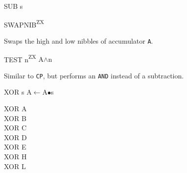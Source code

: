 \documentclass[12pt,twoside,openright,a4paper]{book}
\newcommand{\ZXN}{\textnormal{\textsuperscript{ZX}}}
\begin{document}
\begin{basedescript}{
	\desclabelstyle{\multilinelabel}
	\desclabelwidth{3cm}}
\begin{detailitem}{SUB s}
	\end{detailitem}

	\begin{detailitem}{SWAPNIB\ZXN}
		{
			\scriptsize
		}

		\vspace{3ex} %

		Swaps the high and low nibbles of accumulator {\tt A}.

		\DetailNoEffect
						
		\begin{DetailTiming}
		\end{DetailTiming}

	\end{detailitem}

	\begin{detailitem}{TEST n\ZXN}
		{A$\wedge$n}

		Similar to {\tt CP}, but performs an {\tt AND} instead of a subtraction.

		\begin{DetailEffects}[v]
			\DetailFlags{\FS}{\FS}{\FS}{\FS}{\FU}{\FS}
		\end{DetailEffects}
						
		\begin{DetailTiming}
			\DetailTime{}{3}{11}
		\end{DetailTiming}

	\end{detailitem}

	\begin{detailitem}{XOR s}
		{A$\leftarrow$A$\bullet$s}

		\begin{DetailVariants}
			XOR A\\
			XOR B\\
			XOR C\\
			XOR D\\
			XOR E\\
			XOR H\\
			XOR L


\end{DetailVariants}
\end{detailitem}
\end{basedescript}
\end{document}

